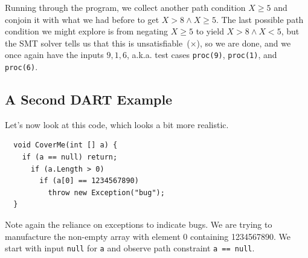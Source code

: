 \documentclass[11pt]{article}
\begin{document}
\begin{center}
\end{center}
Running through the program, we collect another path condition $X \ge 5$ and conjoin it
with what we had before to get $X > 8 \wedge X \ge 5$. The last possible path condition we
might explore is from negating $X \ge 5$ to yield $X > 8 \wedge X < 5$, but the SMT solver
tells us that this is unsatisfiable~($\times$), so we are done, and we once again have the inputs
$9, 1, 6$, a.k.a. test cases \texttt{proc(9)}, \texttt{proc(1)}, and \texttt{proc(6)}.

\subsection*{A Second DART Example}
Let's now look at this code, which looks a bit more realistic.
\begin{lstlisting}
  void CoverMe(int [] a) {
    if (a == null) return;
      if (a.Length > 0)
        if (a[0] == 1234567890)
          throw new Exception("bug");
  }
\end{lstlisting}
Note again the reliance on exceptions to indicate bugs. We are trying to manufacture the non-empty
array with element 0 containing 1234567890. We start with input \texttt{null} for \texttt{a} and observe
path constraint \texttt{a == null}.
\end{document}
